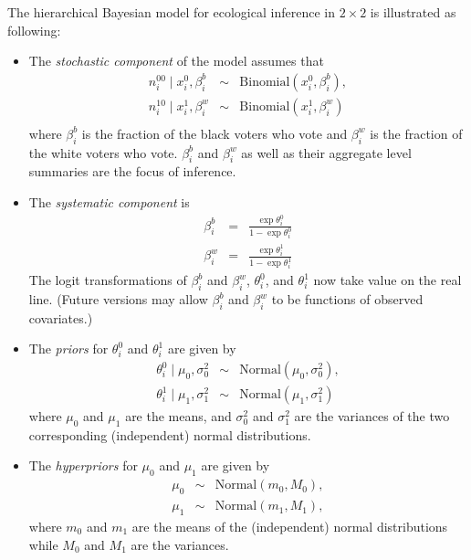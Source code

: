 The hierarchical Bayesian model for ecological inference in $2 \times
2$ is illustrated as following:
\begin{itemize}
\item The \emph{stochastic component} of the model assumes that
\begin{eqnarray*}
n_{i}^{00}\mid x_i^0,\beta_i^b &\sim& \textrm{Binomial}\left(
x_i^0, \beta_i^b\right)  ,\\
n_{i}^{10} \mid x_i^1, \beta_i^w &\sim& \textrm{Binomial}\left(
x_i^1, \beta_i^w\right)  \\
\end{eqnarray*}
where $\beta_{i}^{b}$ is the fraction of the black voters who vote
and $\beta_i^w$ is the fraction of the white voters who vote. $\beta_i^b$ 
and $\beta_i^w$ as well as their aggregate level summaries are the focus
of inference.

\item The \emph{systematic component} is 
\begin{eqnarray*}
\beta_i^b &=& \frac{\exp\theta_i^0}{1 - \exp\theta_i^0} \\
\beta_i^w &=& \frac{\exp\theta_i^1}{1 - \exp\theta_i^1} 
\end{eqnarray*}
The logit transformations of $\beta^b_i$ and $\beta^w_i$, $\theta_{i}^0$, 
and $\theta_i^1$ now take value on the real line. (Future versions may allow
$\beta_{i}^{b}$ and $\beta_{i}^{w}$ to be functions of observed covariates.)

\item The \emph{priors} for $\theta_{i}^0$ and $\theta_{i}^1$
 are given by
\begin{eqnarray*}
\theta_{i}^{0}   \mid\mu_{0},\sigma_{0}^{2}&\sim&\textrm{Normal}\left(  \mu
_{0},\sigma_{0}^{2}\right),\\
\theta_{i}^{1}  \mid\mu_{1},\sigma_{1}^{2}&\sim&\textrm{Normal}\left(  \mu
_{1},\sigma_{1}^{2}\right)  
\end{eqnarray*}
where $\mu_{0}$ and $\mu_{1}$ are the means, and $\sigma_{0}^{2}$ 
and $\sigma_{1}^{2}$ are the variances of the two corresponding 
(independent) normal distributions.

\item The \emph{hyperpriors} for $\mu_{0}$ and $\mu_{1}$ are given by
\begin{eqnarray*}
\mu_{0}    &\sim& \textrm{Normal} \left(  m_{0}, M_{0} \right)  ,\\
\mu_{1}    &\sim& \textrm{Normal} \left(  m_{1}, M_{1} \right)  ,
\end{eqnarray*}
where $m_{0}$ and $m_{1}$ are the means of the (independent) normal
distributions while $M_{0}$ and $M_{1}$ are the variances.


\end{itemize}
